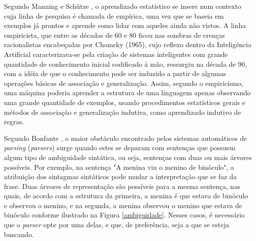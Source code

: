 Segundo Manning e Sch{\"u}tze \cite{manning99}, o aprendizado estatístico se insere num contexto cuja linha de pesquisa é chamada de empírica, uma vez que se baseia em exemplos já prontos e aprende como lidar com aqueles ainda não vistos. A linha empiricista, que entre as décadas de 60 e 80 ficou nas sombras de crenças racionalistas encabeçadas por Chomsky (1965), cujo reflexo dentro da Inteligência Artificial caracterizava-se pela criação de sistemas inteligentes com grande quantidade de conhecimento inicial codificado à mão, ressurgiu na década de 90, com a idéia de que o conhecimento pode ser induzido a partir de algumas operações básicas de associação e generalização. Assim, segundo o empiricismo, uma máquina poderia aprender a estrutura de uma linguagem apenas observando uma grande quantidade de exemplos, usando procedimentos estatísticos gerais e métodos de associação e generalização indutiva, como aprendizado indutivo de regras.

Segundo Bonfante \cite{bonfante03}, o maior obstáculo encontrado pelos sistemas automáticos de \emph{parsing} (\emph{parsers}) surge quando estes se deparam com sentenças que possuem algum tipo de ambiguidade sintática, ou seja, sentenças com duas ou mais árvores possíveis. Por exemplo, na sentença "A menina viu o menino de binóculo", a atribuição dos sintagmas sintáticos pode mudar a interpretação que se faz da frase. Duas árvores de representação são possíveis para a mesma sentença, nas quais, de acordo com a estrutura da primeira, a menina é que estava de binóculo e observou o menino, e na segunda, a menina observou o menino que estava de binóculo conforme ilustrado na Figura \ref{ambiguidade}. Nesses casos, é necessário que o \emph{parser} opte por uma delas, e que, de preferência, seja a que se esteja buscando.

